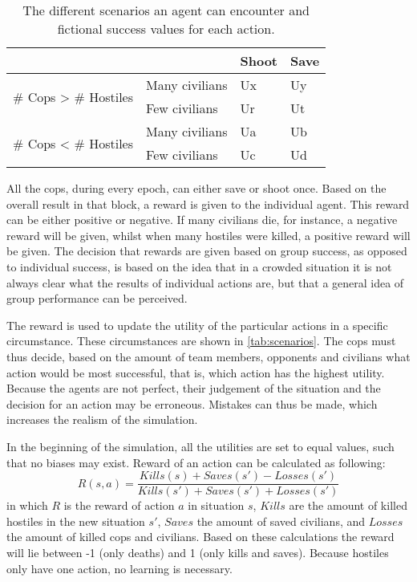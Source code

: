 \begin{table}[!ht]
\begin{center}
\begin{tabular}{l l | l l}
\hline
 & & Shoot & Save \\
\hline
\multirow{2}{*}{\# Cops > \# Hostiles} & Many civilians & Ux & Uy \\
 & Few civilians & Ur & Ut \\
\hline
\multirow{2}{*}{\# Cops < \# Hostiles} & Many civilians & Ua & Ub\\
 & Few civilians & Uc & Ud\\
\hline
\end{tabular}
\caption{The different scenarios an agent can encounter and fictional success values for each action.}
\label{tab:scenarios}
\end{center}
\end{table}
All the cops, during every epoch, can either save or shoot once. Based on the overall result in that block, a reward is given to the individual agent. This reward can be either positive or negative. If many civilians die, for instance, a negative reward will be given, whilst when many hostiles were killed, a positive reward will be given. The decision that rewards are given based on group success, as opposed to individual success, is based on the idea that in a crowded situation it is not always clear what the results of individual actions are, but that a general idea of group performance can be perceived. 

The reward is used to update the utility of the particular actions in a specific circumstance. These circumstances are shown in \autoref{tab:scenarios}. The cops must thus decide, based on the amount of team members, opponents and civilians what action would be most successful, that is, which action has the highest utility. Because the agents are not perfect, their judgement of the situation and the decision for an action may be erroneous. Mistakes can thus be made, which increases the realism of the simulation. 

In the beginning of the simulation, all the utilities are set to equal values, such that no biases may exist. Reward of an action can be calculated as following: 
$$ R(s,a) = \frac{Kills(s) + Saves(s') - Losses(s')}{Kills(s') + Saves(s') + Losses(s')}$$
in which $R$ is the reward of action $a$ in situation $s$, $Kills$ are the amount of killed hostiles in the new situation $s'$, $Saves$ the amount of saved civilians, and $Losses$ the amount of killed cops and civilians. Based on these calculations the reward will lie between -1 (only deaths) and 1 (only kills and saves). Because hostiles only have one action, no learning is necessary. 

